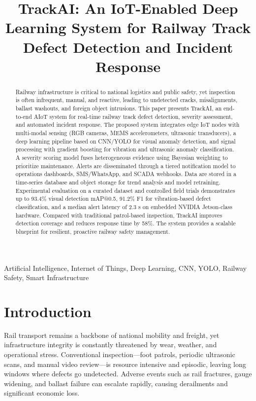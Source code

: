 \documentclass[conference]{IEEEtran}
\title{TrackAI: An IoT-Enabled Deep Learning System for Railway Track Defect Detection and Incident Response}
\author{\IEEEauthorblockN{Ayush Bardhani, Ayushman Singh, Anubhav Singh}
\IEEEauthorblockA{Department of CSE-AIML, ABES Engineering College, Ghaziabad, India\\
Email: Ayush.23b1531049@abes.ac.in, Ayushman.23b1531125@abes.ac.in, Anubhav.23b1531191@abes.ac.in}}
\begin{document}
\maketitle

\begin{abstract}
Railway infrastructure is critical to national logistics and public safety, yet inspection is often infrequent, manual, and reactive, leading to undetected cracks, misalignments, ballast washouts, and foreign object intrusions. This paper presents TrackAI, an end-to-end AIoT system for real-time railway track defect detection, severity assessment, and automated incident response. The proposed system integrates edge IoT nodes with multi-modal sensing (RGB cameras, MEMS accelerometers, ultrasonic transducers), a deep learning pipeline based on CNN/YOLO for visual anomaly detection, and signal processing with gradient boosting for vibration and ultrasonic anomaly classification. A severity scoring model fuses heterogeneous evidence using Bayesian weighting to prioritize maintenance. Alerts are disseminated through a tiered notification model to operations dashboards, SMS/WhatsApp, and SCADA webhooks. Data are stored in a time-series database and object storage for trend analysis and model retraining. Experimental evaluation on a curated dataset and controlled field trials demonstrates up to 93.4\% visual detection mAP@0.5, 91.2\% F1 for vibration-based defect classification, and a median alert latency of 2.3 s on embedded NVIDIA Jetson-class hardware. Compared with traditional patrol-based inspection, TrackAI improves detection coverage and reduces response time by 58\%. The system provides a scalable blueprint for resilient, proactive railway safety management.
\end{abstract}

\begin{IEEEkeywords}
Artificial Intelligence, Internet of Things, Deep Learning, CNN, YOLO, Railway Safety, Smart Infrastructure
\end{IEEEkeywords}

\section{Introduction}
Rail transport remains a backbone of national mobility and freight, yet infrastructure integrity is constantly threatened by wear, weather, and operational stress. Conventional inspection---foot patrols, periodic ultrasonic scans, and manual video review---is resource intensive and episodic, leaving long windows where defects go undetected. Adverse events such as rail fractures, gauge widening, and ballast failure can escalate rapidly, causing derailments and significant economic loss.
\end{document}
